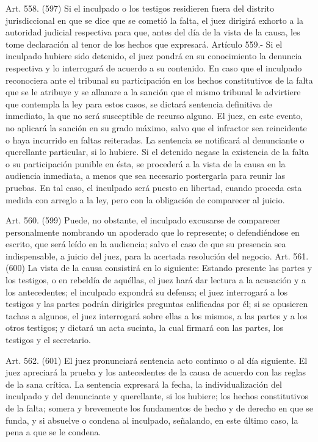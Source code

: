     Art. 558. (597) Si el inculpado o los testigos residieren fuera del distrito jurisdiccional en que se dice que se cometió la falta, el juez dirigirá exhorto a la autoridad judicial respectiva para que, antes del día de la vista de la causa, les tome declaración al tenor de los hechos que expresará.
    Artículo 559.- Si el inculpado hubiere sido detenido, el juez pondrá en su conocimiento la denuncia respectiva y lo interrogará de acuerdo a su contenido. En caso que el inculpado reconociera ante el tribunal su participación en los hechos constitutivos de la falta que se le atribuye y se allanare a la sanción que el mismo tribunal le advirtiere que contempla la ley para estos casos, se dictará sentencia definitiva de inmediato, la que no será susceptible de recurso alguno. El juez, en este evento, no aplicará la sanción en su grado máximo, salvo que el infractor sea reincidente o haya incurrido en faltas reiteradas. La sentencia se notificará al denunciante o querellante particular, si lo hubiere.
    Si el detenido negase la existencia de la falta o su participación punible en ésta, se procederá a la vista de la causa en la audiencia inmediata, a menos que sea necesario postergarla para reunir las pruebas. En tal caso, el inculpado será puesto en libertad, cuando proceda esta medida con arreglo a la ley, pero con la obligación de comparecer al juicio.

    Art. 560. (599) Puede, no obstante, el inculpado excusarse de comparecer personalmente nombrando un apoderado que lo represente; o defendiéndose en escrito, que será leído en la audiencia; salvo el caso de que su presencia sea indispensable, a juicio del juez, para la acertada resolución del negocio.
    Art. 561. (600) La vista de la causa consistirá en lo siguiente:
    Estando presente las partes y los testigos, o en rebeldía de aquéllas, el juez hará dar lectura a la  acusación y a los antecedentes; el inculpado expondrá su defensa; el juez interrogará a los testigos y las partes podrán dirigirles preguntas calificadas por él; si se opusieren tachas a algunos, el juez interrogará sobre ellas a los mismos, a las partes y a los otros testigos; y dictará un acta sucinta, la cual firmará con las partes, los testigos y el secretario.


    Art. 562. (601) El juez pronunciará sentencia acto continuo o al día siguiente.
    El juez apreciará la prueba y los antecedentes de la causa de acuerdo con las reglas de la sana crítica.
    La sentencia expresará la fecha, la individualización del inculpado y del denunciante y querellante, si los hubiere; los hechos constitutivos de la falta; somera y brevemente los fundamentos de hecho y de derecho en que se funda, y si absuelve o condena al inculpado, señalando, en este último caso, la pena a que se le condena.

